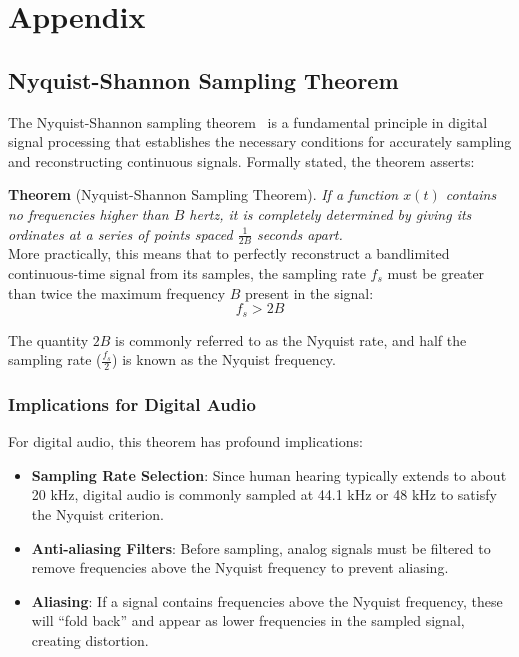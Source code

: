 \documentclass[11pt,twoside]{report}
\numberwithin{thm}{section}
\numberwithin{equation}{section}
\begin{document}
\chapter*{Appendix}
\section*{Nyquist-Shannon Sampling Theorem}
\label{sec:NQST}

The Nyquist-Shannon sampling theorem~\cite{Shannon1949} is a fundamental principle in digital signal processing that establishes the necessary conditions for accurately sampling and reconstructing continuous signals. Formally stated, the theorem asserts:

\textbf{Theorem} (Nyquist-Shannon Sampling Theorem). \textit{If a function $x(t)$ contains no frequencies higher than $B$ hertz, it is completely determined by giving its ordinates at a series of points spaced $\frac{1}{2B}$ seconds apart.} \\


More practically, this means that to perfectly reconstruct a bandlimited continuous-time signal from its samples, the sampling rate $f_s$ must be greater than twice the maximum frequency $B$ present in the signal:
$$f_s > 2B$$

The quantity $2B$ is commonly referred to as the Nyquist rate, and half the sampling rate ($\frac{f_s}{2}$) is known as the Nyquist frequency.

\subsection*{Implications for Digital Audio}

For digital audio, this theorem has profound implications:

\begin{itemize}
    \item \textbf{Sampling Rate Selection}: Since human hearing typically extends to about 20 kHz, digital audio is commonly sampled at 44.1 kHz or 48 kHz to satisfy the Nyquist criterion.
    
    \item \textbf{Anti-aliasing Filters}: Before sampling, analog signals must be filtered to remove frequencies above the Nyquist frequency to prevent aliasing.
    
    \item \textbf{Aliasing}: If a signal contains frequencies above the Nyquist frequency, these will ``fold back'' and appear as lower frequencies in the sampled signal, creating distortion.
\end{itemize}
\end{document}
